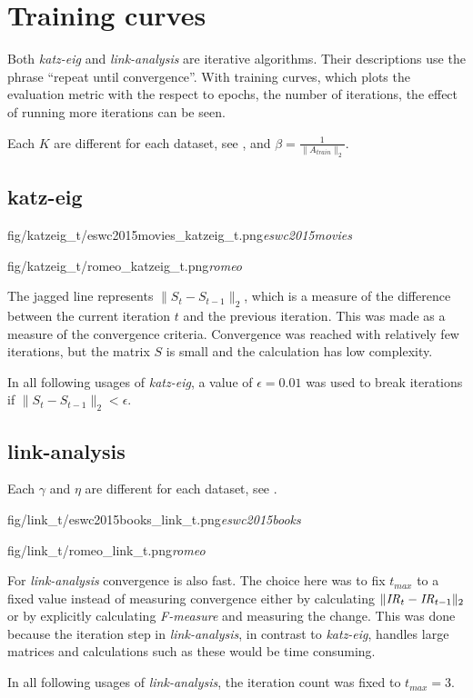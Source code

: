 
\section{Training curves}\label{sec:graphs:training_curves}

Both \textit{katz-eig} and \textit{link-analysis} are iterative algorithms. Their descriptions use the phrase ``repeat until convergence''.  With training curves, which plots the evaluation metric with the respect to epochs, the number of iterations, the effect of running more iterations can be seen.

Each $K$ are different for each dataset, see , and $\beta = \frac{1}{\|A_{train}\|_2}$.

\subsection{katz-eig}

\FloatBarrier

{fig/katzeig_t/eswc2015movies_katzeig_t.png}{\textit{eswc2015movies}}

{fig/katzeig_t/romeo_katzeig_t.png}{\textit{romeo}}

\FloatBarrier

The jagged line represents $\|S_t - S_{t - 1}\|_2$, which is a measure of the difference between the current iteration $t$ and the previous iteration. This was made as a measure of the convergence criteria. Convergence was reached with relatively few iterations, but the matrix $S$ is small and the calculation has low complexity.

In all following usages of \textit{katz-eig}, a value of $\epsilon = 0.01$ was used to break iterations if $\|S_t - S_{t - 1}\|_2 < \epsilon$.

\newpage


\subsection{link-analysis}

Each $\gamma$ and $\eta$ are different for each dataset, see .

{fig/link_t/eswc2015books_link_t.png}{\textit{eswc2015books}}

{fig/link_t/romeo_link_t.png}{\textit{romeo}}

For \textit{link-analysis} convergence is also fast. The choice here was to fix $t_{max}$ to a fixed value instead of measuring convergence either by calculating $\| \mathit{IR}_t - \mathit{IR}_{t - 1} \|_2$
or by explicitly calculating \textit{F-measure} and measuring the change. This was done because the iteration step in \textit{link-analysis}, in contrast to \textit{katz-eig}, handles large matrices and calculations such as these would be time consuming.

In all following usages of \textit{link-analysis}, the iteration count was fixed to $t_{max} = 3$.

